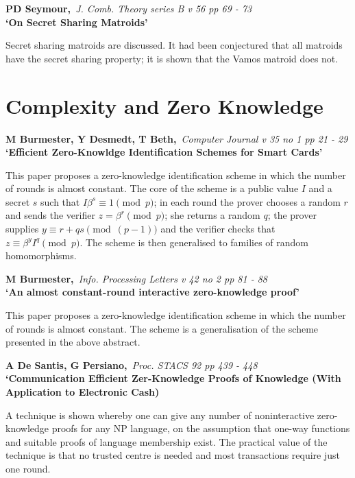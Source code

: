 \pagebreak

{\bf \noindent PD Seymour,}{\em ~J. Comb. Theory series B v 56 pp 69 - 73\\}
{\bf `On Secret Sharing Matroids'}

Secret sharing matroids are discussed. It had been conjectured that all
matroids have the secret sharing property; it is shown that the Vamos matroid
does not.




\normalsize
\section{Complexity and Zero Knowledge}
\small

{\bf \noindent M Burmester, Y Desmedt, T Beth,}{\em ~Computer Journal 
v 35 no 1 pp 21 - 29\\}
{\bf `Efficient Zero-Knowldge Identification Schemes for Smart Cards'}

This paper proposes a zero-knowledge identification scheme in which
the number of rounds is almost constant. The core of the scheme is a public
value $I$ and a secret $s$ such that $I\beta^s \equiv 1 \pmod{p}$; in each
round the prover chooses a random $r$ and sends the verifier $z = \beta^r
\pmod{p}$; she returns a random $q$; the prover supplies $y \equiv r + qs
\pmod{(p-1)}$ and the verifier checks that $z \equiv \beta^yI^q \pmod{p}$.
The scheme is then generalised to families of random homomorphisms.

{\bf \noindent M Burmester,}{\em ~Info. Processing Letters v 42 no 2 pp 81 -
88\\}
{\bf `An almost constant-round interactive zero-knowledge proof'}

This paper proposes a zero-knowledge identification scheme in which
the number of rounds is almost constant. The scheme is a generalisation of
the scheme presented in the above abstract.

{\bf \noindent A De Santis, G Persiano,}{\em ~Proc. STACS 92 pp 439 - 448\\}
{\bf `Communication Efficient Zer-Knowledge Proofs of Knowledge (With
Application to Electronic Cash)}

A technique is shown whereby one can give any number of noninteractive zero-
knowledge proofs for any NP language, on the assumption that one-way functions
and suitable proofs of language membership exist. The practical value of the 
technique is that no trusted centre is needed and most transactions require 
just one round.

